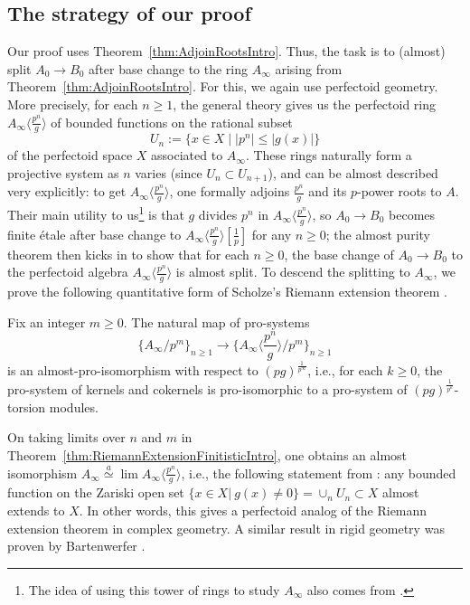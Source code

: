 \documentclass[10pt,reqno]{amsart}
\begin{document}
\subsection{The strategy of our proof}

Our proof uses Theorem~\ref{thm:AdjoinRootsIntro}. Thus, the task is to (almost) split $A_0 \to B_0$ after base change to the ring $A_\infty$ arising from Theorem~\ref{thm:AdjoinRootsIntro}. For this, we again use perfectoid geometry. More precisely, for each $n \geq 1$, the general theory gives us the perfectoid ring $A_\infty \langle \frac{p^n}{g} \rangle$ of bounded functions on the rational subset 
\[U_n := \{x \in X \mid |p^n| \leq |g(x)|\} \]
of the perfectoid space $X$ associated to $A_\infty$. These rings naturally form a projective system as $n$ varies (since $U_n \subset U_{n+1}$), and can be almost described very explicitly: to get $A_\infty \langle \frac{p^n}{g} \rangle$, one formally adjoins $\frac{p^n}{g}$ and its $p$-power roots to $A$.  Their main utility to us\footnote{The idea of using this tower of rings to study $A_\infty$ also comes from \cite{AndrePAL}.} is that $g$ divides $p^n$ in $A_\infty \langle \frac{p^n}{g} \rangle$,  so $A_0 \to B_0$ becomes finite \'etale after base change to $A_\infty \langle \frac{p^n}{g} \rangle[\frac{1}{p}]$ for any $n \geq 0$; the almost purity theorem then kicks in to show that for each $n \geq 0$, the base change of $A_0 \to B_0$ to the perfectoid algebra $A_\infty \langle \frac{p^n}{g} \rangle$ is almost split. To descend the splitting to $A_\infty$, we prove the following quantitative form of Scholze's Riemann extension theorem \cite[Proposition II.3.2]{ScholzeTorsion}. 

\begin{theorem}
\label{thm:RiemannExtensionFinitisticIntro}
Fix an integer $m \geq 0$. The natural map of pro-systems
\begin{equation}
\label{eq:RETIntro}
\{A_\infty/p^m\}_{n \geq 1} \to \{ A_\infty \langle \frac{p^n}{g} \rangle /p^m\}_{n \geq 1} 
\end{equation}
is an almost-pro-isomorphism with respect to $(pg)^{\frac{1}{p^\infty}}$, i.e., for each $k \geq 0$, the pro-system of kernels and cokernels is pro-isomorphic to a pro-system of $(pg)^{\frac{1}{p^k}}$-torsion modules. 
\end{theorem}


\begin{remark}
\label{rmk:ScholzeRH}
On taking limits over $n$ and $m$ in Theorem~\ref{thm:RiemannExtensionFinitisticIntro}, one obtains an almost isomorphism $A_\infty \stackrel{a}{\simeq} \lim A_\infty \langle \frac{p^n}{g} \rangle$, i.e., the following statement from \cite[Proposition II.3.2]{ScholzeTorsion}: any bounded function on the Zariski open set $\{x \in X | \ g(x) \neq 0 \} = \cup_n U_n \subset X$ almost extends to $X$. In other words, this gives a perfectoid analog of the  Riemann extension theorem in complex geometry. A similar result in rigid geometry was proven by Bartenwerfer \cite{Bartenwerfer}. 
\end{remark}
\end{document}
